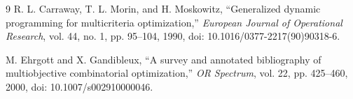 \documentclass[11pt,a4paper]{article}
\begin{document}
\begin{thebibliography}{9}
R. L. Carraway, T. L. Morin, and H. Moskowitz, ``Generalized dynamic programming for multicriteria optimization,'' \textit{European Journal of Operational Research}, vol. 44, no. 1, pp. 95--104, 1990, doi: 10.1016/0377-2217(90)90318-6.

M. Ehrgott and X. Gandibleux, ``A survey and annotated bibliography of multiobjective combinatorial optimization,'' \textit{OR Spectrum}, vol. 22, pp. 425--460, 2000, doi: 10.1007/s002910000046.
\end{thebibliography}
\end{document}

